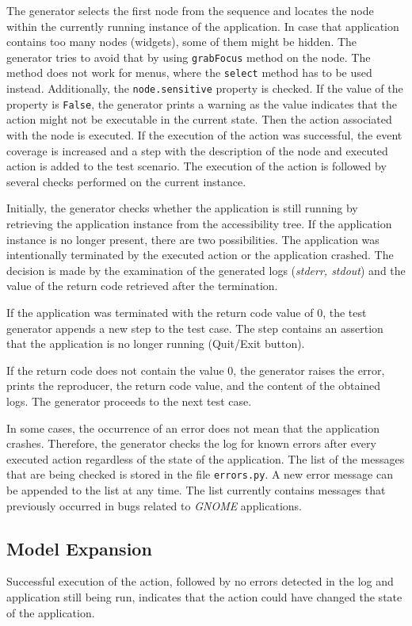 The generator selects the first node from the sequence and locates the node within the currently running instance of the application. In case that application contains too many nodes (widgets), some of them might be hidden. The generator tries to avoid that by using \texttt{grabFocus} method on the node. The method does not work for menus, where the \texttt{select} method has to be used instead.  Additionally, the \texttt{node.sensitive} property is checked. If the value of the property is \texttt{False}, the generator prints a warning as the value indicates that the action might not be executable in the current state. Then the action associated with the node is executed. If the execution of the action was successful, the event coverage is increased and a step with the description of the node and executed action is added to the test scenario. The execution of the action is followed by several checks performed on the current instance.

Initially, the generator checks whether the application is still running by retrieving the application instance from the accessibility tree. If the application instance is no longer present, there are two possibilities. The application was intentionally terminated by the executed action or the application crashed. The decision is made by the examination of the generated logs (\textit{stderr, stdout}) and the value of the return code retrieved after the termination.

If the application was terminated with the return code value of 0, the test generator appends a new step to the test case. The step contains an assertion that the application is no longer running (Quit/Exit button). 

If the return code does not contain the value 0, the generator raises the error, prints the reproducer, the return code value, and the content of the obtained logs. The generator proceeds to the next test case. 

In some cases, the occurrence of an error does not mean that the application crashes. Therefore, the generator checks the log for known errors after every executed action regardless of the state of the application. The list of the messages that are being checked is stored in the file \texttt{errors.py}. A new error message can be appended to the list at any time. The list currently contains messages that previously occurred in bugs related to \textit{GNOME} applications.

\subsection{Model Expansion}
Successful execution of the action, followed by no errors detected in the log and application still being run, indicates that the action could have changed the state of the application. 

